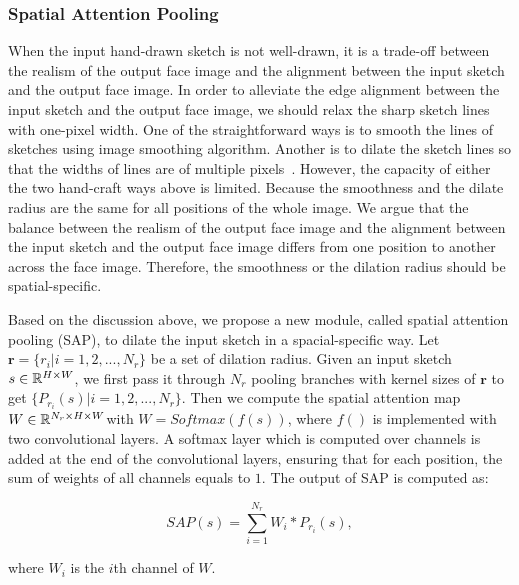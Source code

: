 
\subsubsection{Spatial Attention Pooling}
When the input hand-drawn sketch is not well-drawn, it is a trade-off between the realism of the output face image and the alignment between the input sketch and the output face image.
%
In order to alleviate the edge alignment between the input sketch and the output face image, we should relax the sharp sketch lines with one-pixel width.
One of the straightforward ways is to smooth the lines of sketches using image smoothing algorithm. 
Another is to dilate the sketch lines so that the widths of lines are of multiple pixels~\cite{DeepSurgery}.
However, the capacity of either the two hand-craft ways above is limited. Because the smoothness and the dilate radius are the same for all positions of the whole image.
%
We argue that the balance between the realism of the output face image and the alignment between the input sketch and the output face image differs from one position to another across the face image. Therefore, the smoothness or the dilation radius should be spatial-specific. 

Based on the discussion above, we propose a new module, called spatial attention pooling (SAP), to dilate the input sketch in a spacial-specific way. Let $\mathbf{r}=\{r_i | i=1,2,...,N_r\}$ be a set of dilation radius. Given an input sketch $s\in {\mathbb{R}}^{H\times W}$, we first pass it through $N_r$ pooling branches with kernel sizes of $\mathbf{r}$ to get $\{P_{r_i}(s) | i=1,2,...,N_r\}$. Then we compute the spatial attention map $W\in {\mathbb{R}}^{N_r\times H\times W} $with $W = Softmax(f(s))$, where $f()$ is implemented with two convolutional layers. A softmax layer which is computed over channels is added at the end of the convolutional layers, ensuring that for each position, the sum of weights of all channels equals to $1$. The output of SAP is computed as:
	
\begin{equation}
	SAP(s)=\sum_{i=1}^{N_r} W_i * P_{r_i}(s),
\end{equation}

where $W_i$ is the $i$th channel of $W$.